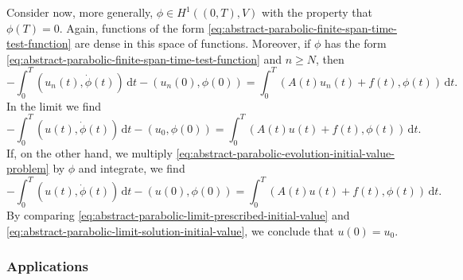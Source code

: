 Consider now, more generally, $\phi\in H^1((0,T),V)$ with the property that $\phi(T)=0$. Again, functions of the form \eqref{eq:abstract-parabolic-finite-span-time-test-function} are dense in this space of functions. Moreover, if $\phi$ has the form \eqref{eq:abstract-parabolic-finite-span-time-test-function} and $n\geq N$, then
\begin{equation}\label{eq:abstract-parabolic-galerkin-initial-trace-identity}
-\int_0^T(u_n(t),\dot\phi(t))\,\mathrm{d}t-(u_n(0),\phi(0))=\int_0^T(A(t)u_n(t)+f(t),\phi(t))\,\mathrm{d}t.
\end{equation}
In the limit we find
\begin{equation}\label{eq:abstract-parabolic-limit-prescribed-initial-value}
-\int_0^T(u(t),\dot\phi(t))\,\mathrm{d}t-(u_0,\phi(0))=\int_0^T(A(t)u(t)+f(t),\phi(t))\,\mathrm{d}t.
\end{equation}
If, on the other hand, we multiply \eqref{eq:abstract-parabolic-evolution-initial-value-problem} by $\phi$ and integrate, we find
\begin{equation}\label{eq:abstract-parabolic-limit-solution-initial-value}
-\int_0^T(u(t),\dot\phi(t))\,\mathrm{d}t-(u(0),\phi(0))=\int_0^T(A(t)u(t)+f(t),\phi(t))\,\mathrm{d}t.
\end{equation}
By comparing \eqref{eq:abstract-parabolic-limit-prescribed-initial-value} and \eqref{eq:abstract-parabolic-limit-solution-initial-value}, we conclude that $u(0)=u_0$.

\subsubsection{Applications}\label{subsec:parabolic-pde-applications}

